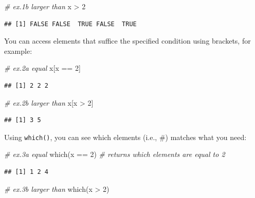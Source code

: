 \documentclass[
]{article}
\newenvironment{Shaded}{\begin{snugshade}}{\end{snugshade}}
\newcommand{\CommentTok}[1]{\textcolor[rgb]{0.56,0.35,0.01}{\textit{#1}}}
\newcommand{\DecValTok}[1]{\textcolor[rgb]{0.00,0.00,0.81}{#1}}
\newcommand{\FunctionTok}[1]{\textcolor[rgb]{0.00,0.00,0.00}{#1}}
\newcommand{\NormalTok}[1]{#1}
\newcommand{\SpecialCharTok}[1]{\textcolor[rgb]{0.00,0.00,0.00}{#1}}
\begin{document}
\begin{Shaded}
\begin{Highlighting}[]
\CommentTok{\# ex.1b larger than}
\NormalTok{x }\SpecialCharTok{\textgreater{}} \DecValTok{2} 
\end{Highlighting}
\end{Shaded}

\begin{verbatim}
## [1] FALSE FALSE  TRUE FALSE  TRUE
\end{verbatim}

You can access elements that suffice the specified condition using brackets, for example:

\begin{Shaded}
\begin{Highlighting}[]
\CommentTok{\# ex.2a equal}
\NormalTok{x[x }\SpecialCharTok{==} \DecValTok{2}\NormalTok{]}
\end{Highlighting}
\end{Shaded}

\begin{verbatim}
## [1] 2 2 2
\end{verbatim}

\begin{Shaded}
\begin{Highlighting}[]
\CommentTok{\# ex.2b larger than}
\NormalTok{x[x }\SpecialCharTok{\textgreater{}} \DecValTok{2}\NormalTok{]}
\end{Highlighting}
\end{Shaded}

\begin{verbatim}
## [1] 3 5
\end{verbatim}

Using \texttt{which()}, you can see which elements (i.e., \#) matches what you need:

\begin{Shaded}
\begin{Highlighting}[]
\CommentTok{\# ex.3a equal}
\FunctionTok{which}\NormalTok{(x }\SpecialCharTok{==} \DecValTok{2}\NormalTok{) }\CommentTok{\# returns which elements are equal to 2}
\end{Highlighting}
\end{Shaded}

\begin{verbatim}
## [1] 1 2 4
\end{verbatim}

\begin{Shaded}
\begin{Highlighting}[]
\CommentTok{\# ex.3b larger than}
\FunctionTok{which}\NormalTok{(x }\SpecialCharTok{\textgreater{}} \DecValTok{2}\NormalTok{)}
\end{Highlighting}
\end{Shaded}
\end{document}

